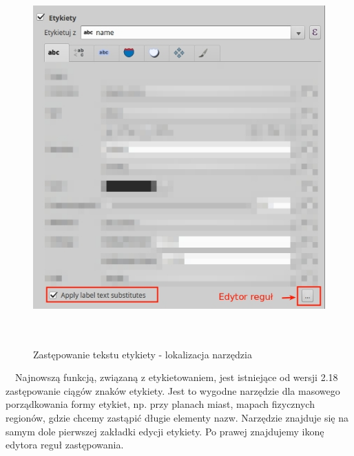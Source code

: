 \documentclass[12pt,a4paper]{book}
\begin{document}
\begin{center}
\begin{figure}
\includegraphics[width=13.864cm,height=14.42cm]{007-etykiety-subs.jpg}
\caption{Zastępowanie tekstu etykiety - lokalizacja narzędzia}
\end{figure}
\end{center}
\ \ Najnowszą funkcją, związaną z etykietowaniem, jest istniejące od wersji 2.18 zastępowanie ciągów znaków etykiety. Jest to wygodne narzędzie dla masowego porządkowania formy etykiet, np. przy planach miast, mapach fizycznych regionów, gdzie chcemy zastąpić długie elementy nazw. Narzędzie znajduje się na samym dole pierwszej zakładki edycji etykiety. Po prawej znajdujemy ikonę edytora reguł zastępowania.
\end{document}
